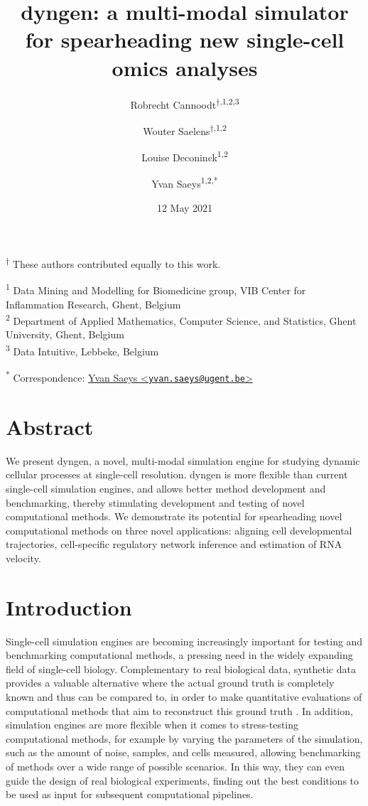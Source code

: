 \documentclass[
  table,
  10pt,
  a4paper]{article}
\title{dyngen: a multi-modal simulator for spearheading new single-cell
omics analyses}
\author{Robrecht Cannoodt\textsuperscript{$\dagger{}$,1,2,3} \and Wouter
Saelens\textsuperscript{$\dagger{}$,1,2} \and Louise
Deconinck\textsuperscript{1,2} \and Yvan Saeys\textsuperscript{1,2,*}}
\date{12 May 2021}
\begin{document}
\maketitle

\textsuperscript{$\dagger{}$}
These authors contributed equally to this work.

\textsuperscript{1} Data Mining and Modelling for Biomedicine group, VIB
Center for Inflammation Research, Ghent, Belgium\\
\textsuperscript{2} Department of Applied Mathematics, Computer Science,
and Statistics, Ghent University, Ghent, Belgium\\
\textsuperscript{3} Data Intuitive, Lebbeke, Belgium

\textsuperscript{*} Correspondence:
\href{mailto:yvan.saeys@ugent.be}{Yvan Saeys
\textless{}\href{mailto:yvan.saeys@ugent.be}{\nolinkurl{yvan.saeys@ugent.be}}\textgreater{}}

\hypertarget{abstract}{%
\section{Abstract}\label{abstract}}

We present dyngen, a novel, multi-modal simulation engine for studying
dynamic cellular processes at single-cell resolution. dyngen is more
flexible than current single-cell simulation engines, and allows better
method development and benchmarking, thereby stimulating development and
testing of novel computational methods. We demonstrate its potential for
spearheading novel computational methods on three novel applications:
aligning cell developmental trajectories, cell-specific regulatory
network inference and estimation of RNA velocity.

\hypertarget{introduction}{%
\section{Introduction}\label{introduction}}

Single-cell simulation engines are becoming increasingly important for
testing and benchmarking computational methods, a pressing need in the
widely expanding field of single-cell biology. Complementary to real
biological data, synthetic data provides a valuable alternative where
the actual ground truth is completely known and thus can be compared to,
in order to make quantitative evaluations of computational methods that
aim to reconstruct this ground truth
\autocite{zappia_splattersimulationsinglecell_2017}. In addition,
simulation engines are more flexible when it comes to stress-testing
computational methods, for example by varying the parameters of the
simulation, such as the amount of noise, samples, and cells measured,
allowing benchmarking of methods over a wide range of possible
scenarios. In this way, they can even guide the design of real
biological experiments, finding out the best conditions to be used as
input for subsequent computational pipelines.
\end{document}
